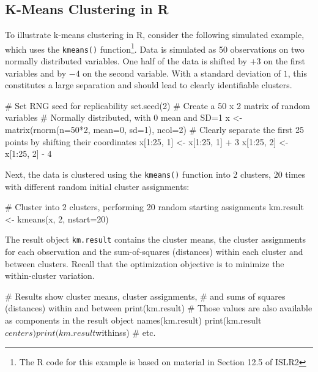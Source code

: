 

\begin{withcode}
\subsection{K-Means Clustering in R}

To illustrate k-means clustering in R, consider the following simulated example, which uses the \texttt{kmeans()} function\footnote{The R code for this example is based on material in Section 12.5 of ISLR2}. Data is simulated as 50 observations on two normally distributed variables. One half of the data is shifted by $+3$ on the first variables and by $-4$ on the second variable. With a standard deviation of $1$, this constitutes a large separation and should lead to clearly identifiable clusters.

\begin{Rcode}
# Set RNG seed for replicability
set.seed(2)
# Create a 50 x 2 matrix of random variables 
# Normally distributed, with 0 mean and SD=1
x <- matrix(rnorm(n=50*2, mean=0, sd=1), ncol=2)
# Clearly separate the first 25 points by shifting their coordinates
x[1:25, 1] <- x[1:25, 1] + 3
x[1:25, 2] <- x[1:25, 2] - 4
\end{Rcode}

\noindent Next, the data is clustered using the \texttt{kmeans()} function into 2 clusters, 20 times with different random initial cluster assignments:

\begin{Rcode}
# Cluster into 2 clusters, performing 20 random starting assignments
km.result <- kmeans(x, 2, nstart=20)
\end{Rcode}

The result object \texttt{km.result} contains the cluster means, the cluster assignments for each observation and the sum-of-squares (distances) within each cluster and between clusters. Recall that the optimization objective is to minimize the within-cluster variation.

\begin{Rcode}
# Results show cluster means, cluster assignments, 
# and sums of squares (distances) within and between 
print(km.result)
# Those values are also available as components in the result object
names(km.result)
print(km.result$centers)
print(km.result$withinss)
# etc.
\end{Rcode}


\end{withcode}
